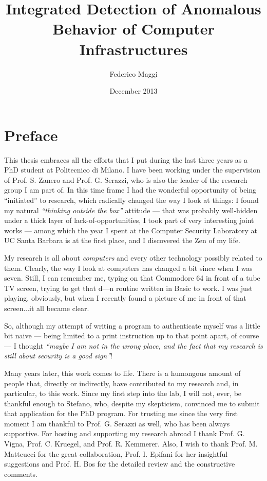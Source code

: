 \documentclass[10pt,showtrims,a4paper,twoside]{memoir} %
\title{Integrated Detection of Anomalous Behavior of Computer Infrastructures} %
\author{Federico Maggi} %
\date{December 2013} %
\begin{document}
\begin{titlingpage}
\maketitle %
\end{titlingpage}

\frontmatter %


\section*{Preface}
This thesis embraces all the efforts that I put during the last three years as a PhD student at Politecnico di Milano. I have been working under the supervision of Prof. S. Zanero and Prof. G. Serazzi, who is also the leader of the research group I am part of. In this time frame I had the wonderful opportunity of being ``initiated'' to research, which radically changed the way I look at things: I found my natural \emph{``thinking outside the box''} attitude --- that was probably well-hidden under a thick layer of lack-of-opportunities, I took part of very interesting joint works --- among which the year I spent at the Computer Security Laboratory at UC Santa Barbara is at the first place, and I discovered the Zen of my life.

My research is all about \emph{computers} and every other technology possibly related to them. Clearly, the way I look at computers has changed a bit since when I was seven. Still, I can remember me, typing on that \textsf{Commodore} 64 in front of a tube TV screen, trying to get that d---n routine written in \textsf{Basic} to work. I was just playing, obviously, but when I recently found a picture of me in front of that screen...it all became clear.

So, although my attempt of writing a program to authenticate myself was a little bit naive --- being limited to a print instruction up to that point apart, of course --- I thought \emph{``maybe I am not in the wrong place, and the fact that my research is still about security is a good sign''}!

Many years later, this work comes to life. There is a humongous amount of people that, directly or indirectly, have contributed to my research and, in particular, to this work. Since my first step into the lab, I will not, ever, be thankful enough to Stefano, who, despite my skepticism, convinced me to submit that application for the PhD program. For trusting me since the very first moment I am thankful to Prof. G. Serazzi as well, who has been always supportive. For hosting and supporting my research abroad I thank Prof. G. Vigna, Prof. C. Kruegel, and Prof. R. Kemmerer. Also, I wish to thank Prof. M. Matteucci for the great collaboration, Prof. I. Epifani for her insightful suggestions and Prof. H. Bos for the detailed review and the constructive comments.
\end{document}
